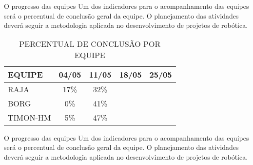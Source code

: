 \begin{frame}[t]{O progresso das equipes}
    Um dos indicadores para o acompanhamento das equipes será o percentual de conclusão geral da equipe.
    O planejamento das atividades deverá seguir a metodologia aplicada no desenvolvimento de projetos de robótica.
    \newline
    \begin{table}[ht!]
    \centering
        \caption{PERCENTUAL DE CONCLUSÃO POR EQUIPE}
        \begin{tabular}{|l|c|c|c|c|} \hline
            \textbf{EQUIPE}&\textbf{04/05}&\textbf{11/05}&\textbf{18/05}&\textbf{25/05}\\ \hline
            RAJA & 17\% &32\% & &  \\ \hline
            BORG & 0\% &41\% & &  \\ \hline
            TIMON-HM & 5\% &47\% & &  \\ \hline
        \end{tabular}
    \end{table}
\end{frame}
\begin{frame}[t]{O progresso das equipes}
    Um dos indicadores para o acompanhamento das equipes será o percentual de conclusão geral da equipe.
    O planejamento das atividades deverá seguir a metodologia aplicada no desenvolvimento de projetos de robótica.
    \newline
\end{frame}
